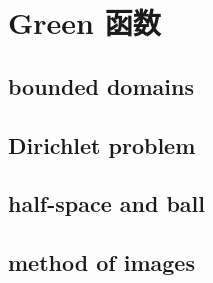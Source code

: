 \section{Green 函数}
\label{b2:sec:1304}


\subsection{bounded domains}
\label{b2:subsec:130401}

\subsection{Dirichlet problem}
\label{b2:subsec:130402}

\subsection{half-space and ball}
\label{b2:subsec:130403}

\subsection{method of images}
\label{b2:subsec:130404}


